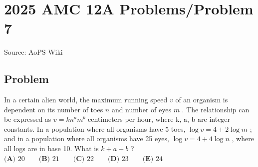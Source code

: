 \documentclass[12pt]{article}
\begin{document}
\section*{{2025 AMC 12A Problems/Problem 7}}
Source: AoPS Wiki

\subsection*{Problem}
In a certain alien world, the maximum running speed $v$ of an organism is dependent on its number of toes $n$ and number of eyes $m$ . The relationship can be expressed as $v = kn^am^b$ centimeters per hour, where k, a, b are integer constants. In a population where all organisms have 5 toes, $\log v = 4+2\log m$ ; and in a population where all organisms have 25 eyes, $\log v = 4 + 4 \log n$ , where all logs are in base 10. What is $k+a+b$ ? $\textbf{(A) } 20 \qquad \textbf{(B) } 21 \qquad \textbf{(C) } 22 \qquad \textbf{(D) } 23 \qquad \textbf{(E) } 24$
\end{document}
